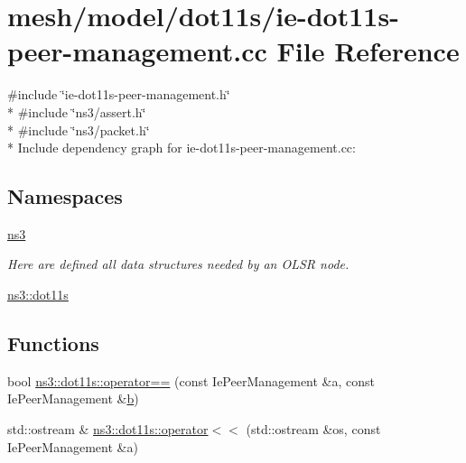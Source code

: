 \hypertarget{ie-dot11s-peer-management_8cc}{}\section{mesh/model/dot11s/ie-\/dot11s-\/peer-\/management.cc File Reference}
\label{ie-dot11s-peer-management_8cc}
{\ttfamily \#include \char`\"{}ie-\/dot11s-\/peer-\/management.\+h\char`\"{}}\\*
{\ttfamily \#include \char`\"{}ns3/assert.\+h\char`\"{}}\\*
{\ttfamily \#include \char`\"{}ns3/packet.\+h\char`\"{}}\\*
Include dependency graph for ie-\/dot11s-\/peer-\/management.cc\+:
\subsection*{Namespaces}
\begin{DoxyCompactItemize}
\item 
 \hyperlink{namespacens3}{ns3}
\begin{DoxyCompactList}\small\item\em Here are defined all data structures needed by an O\+L\+SR node. \end{DoxyCompactList}\item 
 \hyperlink{namespacens3_1_1dot11s}{ns3\+::dot11s}
\end{DoxyCompactItemize}
\subsection*{Functions}
\begin{DoxyCompactItemize}
\item 
bool \hyperlink{namespacens3_1_1dot11s_a61409b652bdbb029d73d8f91109cf72d}{ns3\+::dot11s\+::operator==} (const Ie\+Peer\+Management \&a, const Ie\+Peer\+Management \&\hyperlink{lte__pathloss_8m_a21ad0bd836b90d08f4cf640b4c298e7c}{b})
\item 
std\+::ostream \& \hyperlink{namespacens3_1_1dot11s_a89ba4dd621cbd226af1aa1fc2c66c15a}{ns3\+::dot11s\+::operator$<$$<$} (std\+::ostream \&os, const Ie\+Peer\+Management \&a)
\end{DoxyCompactItemize}
